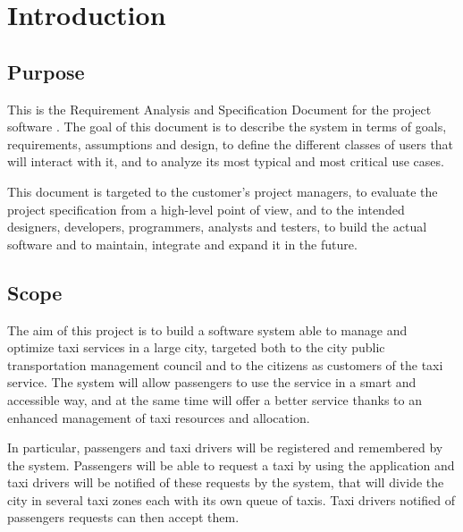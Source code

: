 \chapter{Introduction}


\section{Purpose}
This is the Requirement Analysis and Specification Document for the project software \mts{}. The goal of this document is to describe the system in terms of goals, requirements, assumptions and design, to define the different classes of users that will interact with it, and to analyze its most typical and most critical use cases.

This document is targeted to the customer's project managers, to evaluate the project specification from a high-level point of view, and to the intended designers, developers, programmers, analysts and testers, to build the actual software and to maintain, integrate and expand it in the future.


\section{Scope}
The aim of this project is to build a software system able to manage and optimize taxi services in a large city, targeted both to the city public transportation management council and to the citizens as customers of the taxi service. The system will allow passengers to use the service in a smart and accessible way, and at the same time will offer a better service thanks to an enhanced management of taxi resources and allocation.

In particular, passengers and taxi drivers will be registered and remembered by the system. Passengers will be able to request a taxi by using the application and taxi drivers will be notified of these requests by the system, that will divide the city in several taxi zones each with its own queue of taxis. Taxi drivers notified of passengers requests can then accept them.

